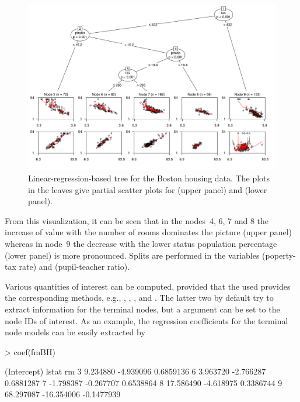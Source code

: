 \documentclass{Z}
\begin{document}
\begin{figure}[p]
\begin{center}
\includegraphics[width=18cm,keepaspectratio,angle=90]{MOB-BostonHousing-plot}
\caption{\label{fig:BostonHousing} Linear-regression-based tree for the Boston housing data.
The plots in the leaves give partial scatter plots for  (upper panel) and 
 (lower panel).}
\end{center}
\end{figure}

From this visualization, it can be seen that in the nodes~4, 6, 7 and 8 the increase of
value with the number of rooms dominates the picture (upper panel) whereas in node~9 the
decrease with the lower status population percentage (lower panel) is more pronounced. 
Splits are performed in the variables  (poperty-tax rate) and
 (pupil-teacher ratio).

Various quantities of interest can be computed, provided that the  used
provides the corresponding methods, e.g., , , ,
 and . The latter two by default try to extract information
for the terminal nodes, but a  argument can be set to the node IDs of interest.
As an example, the regression coefficients for the terminal node models can be easily 
extracted by

\begin{Schunk}
\begin{Sinput}
> coef(fmBH)
\end{Sinput}
\begin{Soutput}
  (Intercept)      lstat         rm
3    9.234880  -4.939096  0.6859136
6    3.963720  -2.766287  0.6881287
7   -1.798387  -0.267707  0.6538864
8   17.586490  -4.618975  0.3386744
9   68.297087 -16.354006 -0.1477939
\end{Soutput}
\end{Schunk}
\end{document}
